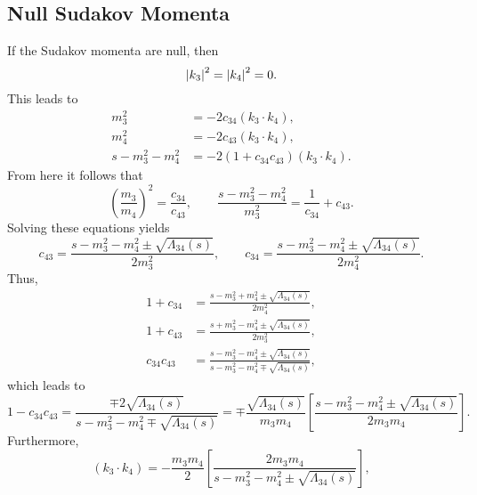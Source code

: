 \subsection{Null Sudakov Momenta}
If the Sudakov momenta are null, then
\begin{equation}
	\left\lvert k_{3} \right\rvert^{2} = \left\lvert k_{4} \right\rvert^{2} = 0.
\end{equation}
This leads to
\begin{equation}
\begin{split}
	m_{3}^{2} &= -2 c_{34} \left(k_{3} \cdot k_{4} \right), \\
	m_{4}^{2} &= -2 c_{43} \left(k_{3} \cdot k_{4} \right), \\
	s - m_{3}^{2} - m_{4}^{2} &= -2\left(1 + c_{34}c_{43} \right) \left(k_{3} \cdot k_{4} \right).
\end{split}
\end{equation}
From here it follows that
\begin{equation}
	\left( \frac{m_{3}}{m_{4}} \right)^{2} = \frac{c_{34}}{c_{43}}, \qquad \frac{s - m_{3}^{2} - m_{4}^{2}}{m_{3}^{2}} = \frac{1}{c_{34}} + c_{43}.
\end{equation}
Solving these equations yields
\begin{equation}
	c_{43} = \frac{s - m_{3}^{2} - m_{4}^{2} \pm \sqrt{\Lambda_{34}(s)}}{2 m_{3}^{2}}, \qquad c_{34} = \frac{s - m_{3}^{2} - m_{4}^{2} \pm \sqrt{\Lambda_{34}(s)}}{2 m_{4}^{2}}.
\end{equation}
Thus,
\begin{align}
	1 + c_{34} &= \frac{s - m_{3}^{2} + m_{4}^{2} \pm \sqrt{\Lambda_{34}(s)}}{2 m_{4}^{2}}, \\
	1 + c_{43} &= \frac{s + m_{3}^{2} - m_{4}^{2} \pm \sqrt{\Lambda_{34}(s)}}{2 m_{3}^{2}}, \\
	c_{34} c_{43} &= \frac{s - m_{3}^{2} - m_{4}^{2} \pm \sqrt{\Lambda_{34}(s)}}{s - m_{3}^{2} - m_{4}^{2} \mp \sqrt{\Lambda_{34}(s)}},
\end{align}
which leads to
\begin{equation}
	1 - c_{34} c_{43} = \frac{\mp 2 \sqrt{\Lambda_{34}(s)}}{s - m_{3}^{2} - m_{4}^{2} \mp \sqrt{\Lambda_{34}(s)}} = \mp \frac{\sqrt{\Lambda_{34}(s)}}{m_{3} m_{4}} \left[ \frac{s - m_{3}^{2} - m_{4}^{2} \pm \sqrt{\Lambda_{34}(s)}}{2 m_{3} m_{4}} \right] .
\end{equation}
Furthermore,
\begin{equation}
	\left( k_{3} \cdot k_{4} \right) = - \frac{m_{3} m_{4}}{2} \left[ \frac{2m_{3} m_{4}}{s - m_{3}^{2} - m_{4}^{2} \pm \sqrt{\Lambda_{34}(s)}} \right],
\end{equation}
